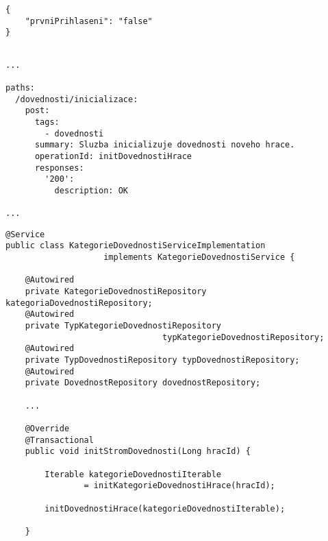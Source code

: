 \documentclass[twoside, 12pt]{article}
\begin{document}
{{\begin{lstlisting}
{
    "prvniPrihlaseni": "false"
}
\end{lstlisting}

\vspace{10}


\vspace{10}




\begin{lstlisting}

...

paths:
  /dovednosti/inicializace:
    post:
      tags:
        - dovednosti
      summary: Sluzba inicializuje dovednosti noveho hrace.
      operationId: initDovednostiHrace
      responses:
        '200':
          description: OK

...

\end{lstlisting}

\vspace{50}


\begin{lstlisting}
@Service
public class KategorieDovednostiServiceImplementation
                    implements KategorieDovednostiService {

    @Autowired
    private KategorieDovednostiRepository kategoriaDovednostiRepository;
    @Autowired
    private TypKategorieDovednostiRepository
                                typKategorieDovednostiRepository;
    @Autowired
    private TypDovednostiRepository typDovednostiRepository;
    @Autowired
    private DovednostRepository dovednostRepository;

    ...

    @Override
    @Transactional
    public void initStromDovednosti(Long hracId) {

        Iterable kategorieDovednostiIterable
                = initKategorieDovednostiHrace(hracId);

        initDovednostiHrace(kategorieDovednostiIterable);

    }


\end{lstlisting}}}
\end{document}

